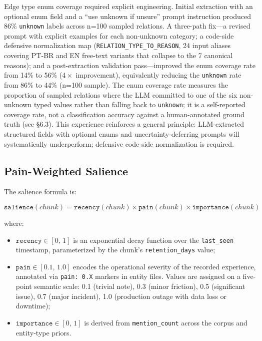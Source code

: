 Edge type enum coverage required explicit engineering. Initial extraction with an optional
enum field and a ``use unknown if unsure'' prompt instruction produced 86\% \texttt{unknown}
labels across n=100 sampled relations. A three-path fix---a revised prompt with explicit
examples for each non-unknown category; a code-side defensive normalization map
(\texttt{RELATION\_TYPE\_TO\_REASON}, 24 input aliases covering PT-BR and EN free-text
variants that collapse to the 7 canonical reasons); and a post-extraction validation
pass---improved the enum coverage rate from 14\% to 56\% ($4\times$ improvement),
equivalently reducing the \texttt{unknown} rate from 86\% to 44\% (n=100 sample). The
enum coverage rate measures the proportion of sampled relations where the LLM committed to
one of the six non-unknown typed values rather than falling back to \texttt{unknown}; it is
a self-reported coverage rate, not a classification accuracy against a human-annotated
ground truth (see \S6.3). This experience reinforces a general principle: LLM-extracted
structured fields with optional enums and uncertainty-deferring prompts will systematically
underperform; defensive code-side normalization is required.

\subsection{Pain-Weighted Salience}

The salience formula is:

\begin{equation}
  \texttt{salience}(\mathit{chunk}) =
    \texttt{recency}(\mathit{chunk})
    \times \texttt{pain}(\mathit{chunk})
    \times \texttt{importance}(\mathit{chunk})
  \label{eq:salience}
\end{equation}

\noindent where:
\begin{itemize}
  \item $\texttt{recency} \in [0,\,1]$ is an exponential decay function over the
    \texttt{last\_seen} timestamp, parameterized by the chunk's \texttt{retention\_days}
    value;
  \item $\texttt{pain} \in [0.1,\,1.0]$ encodes the operational severity of the recorded
    experience, annotated via \texttt{pain: 0.X} markers in entity files. Values are
    assigned on a five-point semantic scale: 0.1 (trivial note), 0.3 (minor friction),
    0.5 (significant issue), 0.7 (major incident), 1.0 (production outage with data loss
    or downtime);
  \item $\texttt{importance} \in [0,\,1]$ is derived from \texttt{mention\_count} across
    the corpus and entity-type priors.
\end{itemize}


